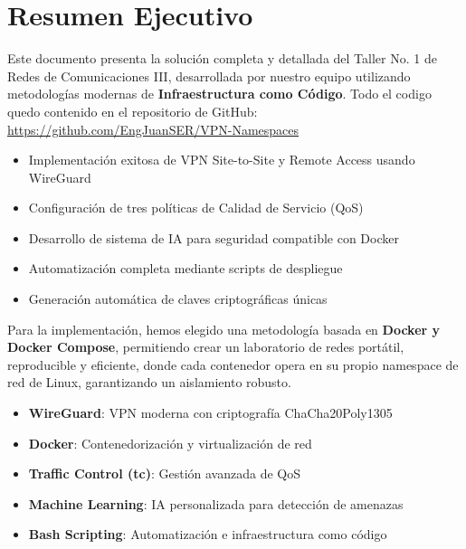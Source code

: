 \section{Resumen Ejecutivo}

Este documento presenta la solución completa y detallada del Taller No. 1 de Redes de Comunicaciones III, desarrollada por nuestro equipo utilizando metodologías modernas de \textbf{Infraestructura como Código}.
Todo el codigo quedo contenido en el repositorio de GitHub: \url{https://github.com/EngJuanSER/VPN-Namespaces}
\begin{exito}
\begin{itemize}
    \item Implementación exitosa de VPN Site-to-Site y Remote Access usando WireGuard
    \item Configuración de tres políticas de Calidad de Servicio (QoS)
    \item Desarrollo de sistema de IA para seguridad compatible con Docker
    \item Automatización completa mediante scripts de despliegue
    \item Generación automática de claves criptográficas únicas
\end{itemize}
\end{exito}

Para la implementación, hemos elegido una metodología basada en \textbf{Docker y Docker Compose}, permitiendo crear un laboratorio de redes portátil, reproducible y eficiente, donde cada contenedor opera en su propio namespace de red de Linux, garantizando un aislamiento robusto.

\begin{destacado}
\begin{itemize}
    \item \textbf{WireGuard}: VPN moderna con criptografía ChaCha20Poly1305
    \item \textbf{Docker}: Contenedorización y virtualización de red
    \item \textbf{Traffic Control (tc)}: Gestión avanzada de QoS
    \item \textbf{Machine Learning}: IA personalizada para detección de amenazas
    \item \textbf{Bash Scripting}: Automatización e infraestructura como código
\end{itemize}
\end{destacado}
